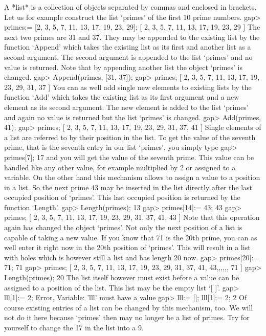 

A *list* is a collection of objects separated by  commas and enclosed  in
brackets.  Let us for example construct the list `primes' of the first 10
prime numbers.
\beginexample
    gap> primes:= [2, 3, 5, 7, 11, 13, 17, 19, 23, 29];
    [ 2, 3, 5, 7, 11, 13, 17, 19, 23, 29 ]
\endexample
The next two primes are  31 and 37.  They may be appended to the existing
list by the function `Append' which takes  the existing list as its first
and another list as a second argument.  The  second argument  is appended
to the list `primes' and  no  value is returned.  Note that  by appending
another list the object `primes' is changed.
\beginexample
    gap> Append(primes, [31, 37]);
    gap> primes;
    [ 2, 3, 5, 7, 11, 13, 17, 19, 23, 29, 31, 37 ] 
\endexample
You can as well add single new elements to existing lists by the function
`Add'  which takes  the existing list  as its  first argument  and  a new
element as  its second argument.  The  new  element  is added to the list
`primes' and again no value is returned but the list `primes' is changed.
\beginexample
    gap> Add(primes, 41);
    gap> primes;
    [ 2, 3, 5, 7, 11, 13, 17, 19, 23, 29, 31, 37, 41 ] 
\endexample
Single elements of a list are referred to by their position in the  list.
To get the value  of the seventh prime, that is the seventh entry in  our
list `primes', you simply type
\beginexample
    gap> primes[7];
    17 
\endexample
and you  will get the  value  of the  seventh prime.  This  value  can be
handled like any other value, for example multiplied by 2 or  assigned to
a variable.  On the other hand this mechanism allows to assign a value to
a  position in  a list.  So the next prime 43 may be inserted in the list
directly  after  the  last  occupied  position  of `primes'.   This  last
occupied position is returned by the function `Length'.
\beginexample
    gap> Length(primes);
    13
    gap> primes[14]:= 43;
    43
    gap> primes;
    [ 2, 3, 5, 7, 11, 13, 17, 19, 23, 29, 31, 37, 41, 43 ] 
\endexample
Note that this operation again has changed the object `primes'.  Not only
the next position of a list is capable  of taking  a  new  value.  If you
know that 71 is the 20th prime, you can as well enter it right now in the
20th position of `primes'.   This  will result in a list with holes which
is however still a list and has length 20 now.
\beginexample
    gap> primes[20]:= 71;
    71
    gap> primes;
    [ 2, 3, 5, 7, 11, 13, 17, 19, 23, 29, 31, 37, 41, 43,,,,,, 71 ]
    gap> Length(primes);
    20 
\endexample
The list itself however must  exist before a  value can be  assigned to a
position of the list.  This list may be the empty list `[ ]'.
\beginexample
    gap> lll[1]:= 2;
    Error, Variable: 'lll' must have a value
    gap> lll:= []; lll[1]:= 2;
    2 
\endexample
Of course  existing entries of a list  can be  changed by this mechanism,
too. We will not do it here because `primes' then may no longer be a list
of primes. Try for yourself to change the 17 in the list into a 9.

